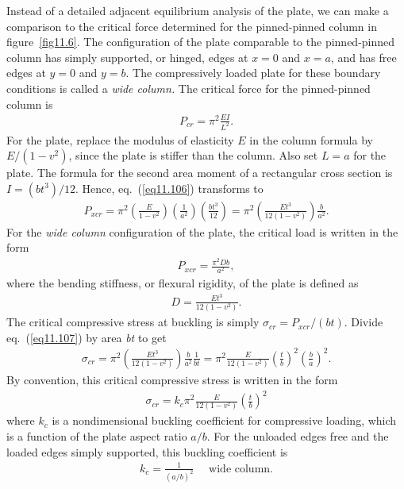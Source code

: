 \documentclass{AeroStructure-ERJohnson}
\begin{document}
Instead of a detailed adjacent equilibrium analysis of the plate, we can make a comparison to the critical force determined for the pinned-pinned column in figure~\ref{fig11.6}. The configuration of the plate comparable to the pinned-pinned column has simply supported, or hinged, edges at $x=0$ and $x=a$, and has free edges at $y=0$ and $y=b$. The compressively loaded plate for these boundary conditions is called a \textit{wide column.} The critical force for the pinned-pinned column is
\begin{align}\label{eq11.106}
P_{c r}=\pi^{2} \frac{E I}{L^{2}}.
\end{align}
For the plate, replace the modulus of elasticity $E$ in the column formula by $E /\left(1-v^{2}\right)$, since the plate is stiffer than the column. Also set $L=a$ for the plate. The formula for the second area moment of a rectangular cross section is $I=\left(b t^{3}\right)/12$. Hence, eq.~(\ref{eq11.106}) transforms to
\begin{align}\label{eq11.107}
P_{x c r}=\pi^{2}\left(\frac{E}{1-v^{2}}\right)\left(\frac{1}{a^{2}}\right)\left(\frac{b t^{3}}{12}\right)=\pi^{2}\left(\frac{E t^{3}}{12\left(1-v^{2}\right)}\right) \frac{b}{a^{2}}.
\end{align}
For the \textit{wide column} configuration of the plate, the critical load is written in the form
\begin{align}\label{eq11.108}
P_{x c r}=\frac{\pi^{2} D b}{a^{2}},
\end{align}
where the bending stiffness, or flexural rigidity, of the plate is defined as
\begin{align}\label{eq11.109}
D=\frac{E t^{3}}{12\left(1-v^{2}\right)}.
\end{align}
The critical compressive stress at buckling is simply $\sigma_{cr}=P_{xcr}/(bt)$. Divide eq.~(\ref{eq11.107}) by area \textit{bt} to get
\begin{align*}
\sigma_{c r}=\pi^{2}\left(\frac{E t^{3}}{12\left(1-v^{2}\right)}\right) \frac{b}{a^{2}} \frac{1}{b t}=\pi^{2} \frac{E}{12\left(1-v^{2}\right)}\left(\frac{t}{b}\right)^{2}\left(\frac{b}{a}\right)^{2}.
\end{align*}
By convention, this critical compressive stress is written in the form
\begin{align}
\boxed{\sigma_{c r}=k_{c} \pi^{2} \frac{E}{12\left(1-v^{2}\right)}\left(\frac{t}{b}\right)^{2}} \label{eq11.110}
\end{align}
where $k_{c}$ is a nondimensional buckling coefficient for compressive loading, which is a function of the plate aspect ratio $a/b$. For the unloaded edges free and the loaded edges simply supported, this buckling coefficient is
\begin{align}\label{eq11.111}
k_{c}=\frac{1}{(a/b)^{2}} \quad \text { wide column}.
\end{align}
\end{document}
